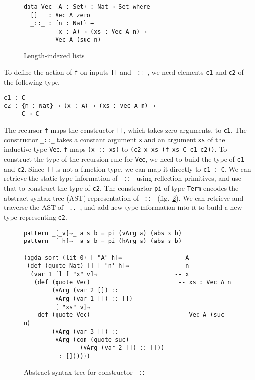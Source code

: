 \documentclass[sigplan,10pt]{acmart}
\begin{document}
\begin{figure}
\begin{center}
\begin{BVerbatim}
data Vec (A : Set) : Nat → Set where
  []   : Vec A zero
  _::_ : {n : Nat} →
         (x : A) → (xs : Vec A n) → 
         Vec A (suc n)
\end{BVerbatim}
\end{center}
\caption{Length-indexed lists}
\label{fig:vec}
\end{figure}

To define the action of {\tt f} on inputs {\tt []} and {\tt \_::\_}, we need elements {\tt c1} and {\tt c2} of the following type.

\begin{center}
\begin{BVerbatim}
c1 : C
c2 : {m : Nat} → (x : A) → (xs : Vec A m) → 
     C → C
\end{BVerbatim}
\end{center}

The recursor {\tt f} maps the constructor {\tt []}, which takes zero arguments, to {\tt c1}. The constructor {\tt \_::\_} takes a constant argument {\tt x} and an argument {\tt xs} of the inductive type {\tt Vec}. {\tt f} maps {\tt (x :: xs)} to {\tt (c2 x xs (f xs C c1 c2))}. To construct the type of the recursion rule for {\tt Vec}, we need to build the type of {\tt c1} and {\tt c2}. Since {\tt []} is not a function type, we can map it directly to {\tt c1 : C}. We can retrieve the static type information of {\tt \_::\_} using reflection primitives, and use that to construct the type of {\tt c2}. The constructor {\tt pi} of type {\tt Term} encodes the abstract syntax tree (AST) representation of {\tt \_::\_} (fig.~\ref{fig:ast-g}). We can retrieve and traverse the AST of {\tt \_::\_}, and add new type information into it to build a new type representing {\tt c2}.

\begin{figure}
\begin{center}
\begingroup
\fontsize{7pt}{9pt}\selectfont
\begin{Verbatim}
pattern _[_v]⇒_ a s b = pi (vArg a) (abs s b)
pattern _[_h]⇒_ a s b = pi (hArg a) (abs s b)

(agda-sort (lit 0) [ "A" h]⇒               -- A
 (def (quote Nat) [] [ "n" h]⇒             -- n
  (var 1 [] [ "x" v]⇒                      -- x
   (def (quote Vec)                         -- xs : Vec A n
        (vArg (var 2 []) ::
         vArg (var 1 []) :: [])
         [ "xs" v]⇒
    def (quote Vec)                         -- Vec A (suc n)
        (vArg (var 3 []) ::
         vArg (con (quote suc)
                (vArg (var 2 []) :: []))
         :: [])))))
\end{Verbatim}
\endgroup
\end{center}
\caption{Abstract syntax tree for constructor {\tt \_::\_}}
\label{fig:ast-g}
\end{figure}
\normalsize
\end{document}
